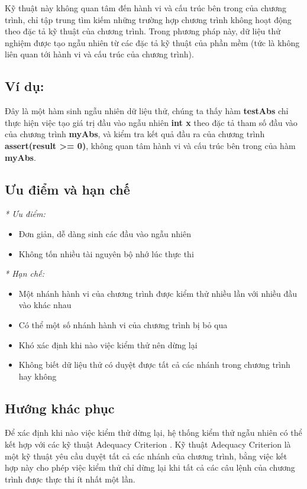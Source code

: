 Kỹ thuật này không quan tâm đến hành vi và cấu trúc bên trong của chương trình, chỉ tập trung tìm kiếm những trường hợp chương trình không hoạt động theo đặc tả kỹ thuật của chương trình. Trong phương pháp này, dữ liệu thử nghiệm được tạo ngẫu nhiên từ các đặc tả kỹ thuật của phần mềm (tức là không liên quan tới hành vi và cấu trúc của chương trình).

\subsection*{Ví dụ:}

Đây là một hàm sinh ngẫu nhiên dữ liệu thử, chúng ta thấy hàm \textbf{testAbs} chỉ thực hiện việc tạo giá trị đầu vào ngẫu nhiên \textbf{int x} theo đặc tả tham số đầu vào của chương trình \textbf{myAbs}, và kiểm tra kết quả đầu ra của chương trình \textbf{assert(result >= 0)}, không quan tâm hành vi và cấu trúc bên trong của hàm \textbf{myAbs}.

\subsection*{Ưu điểm và hạn chế}

\textit{* Ưu điểm:}
\begin{itemize}
	\item Đơn giản, dễ dàng sinh các đầu vào ngẫu nhiên
	\item Không tốn nhiều tài nguyên bộ nhớ lúc thực thi
\end{itemize}

\textit{* Hạn chế:}
\begin{itemize}
	\item Một nhánh hành vi của chương trình được kiểm thử nhiều lần với nhiều đầu vào khác nhau
	\item Có thể một số nhánh hành vi của chương trình bị bỏ qua
	\item Khó xác định khi nào việc kiểm thử nên dừng lại
	\item Không biết dữ liệu thử có duyệt được tất cả các nhánh trong chương trình hay không
\end{itemize}

\subsection*{Hướng khác phục}
Để xác định khi nào việc kiểm thử dừng lại, hệ thống kiểm thử ngẫu nhiên có thể kết hợp với các kỹ thuật Adequacy Criterion \cite{zhu1997software}. Kỹ thuật Adequacy Criterion là một kỹ thuật yêu cầu duyệt tất cả các nhánh của chương trình, bằng việc kết hợp này cho phép việc kiểm thử chỉ dừng lại khi tất cả các câu lệnh của chương trình được thực thi ít nhất một lần.

